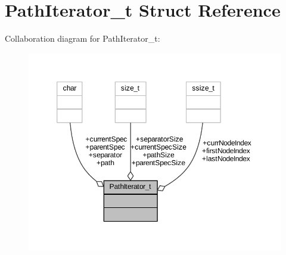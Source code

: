 \hypertarget{struct_path_iterator__t}{}\section{Path\+Iterator\+\_\+t Struct Reference}
\label{struct_path_iterator__t}


Collaboration diagram for Path\+Iterator\+\_\+t\+:
\nopagebreak
\begin{figure}[H]
\begin{center}
\leavevmode
\includegraphics[width=350pt]{struct_path_iterator__t__coll__graph}
\end{center}
\end{figure}
